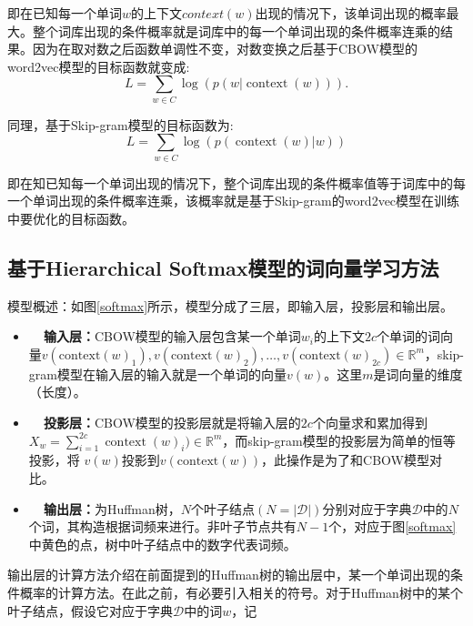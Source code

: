 即在已知每一个单词$w$的上下文$context(w)$出现的情况下，该单词出现的概率最大。整个词库出现的条件概率就是词库中的每一个单词出现的条件概率连乘的结果。因为在取对数之后函数单调性不变，对数变换之后基于CBOW模型的word2vec模型的目标函数就变成:
\begin{equation}
L = \sum _ { w \in C } \log \left( p \left( w | \operatorname { context } \left( w \right) \right) \right). 
\end{equation}

同理，基于Skip-gram模型的目标函数为:
\begin{equation}
L = \sum _ { w \in C } \log \left( p \left( \operatorname { context } \left( w \right) | w \right) \right)
\end{equation}

即在知已知每一个单词出现的情况下，整个词库出现的条件概率值等于词库中的每一个单词出现的条件概率连乘，该概率就是基于Skip-gram的word2vec模型在训练中要优化的目标函数。

\subsection{基于Hierarchical Softmax模型的词向量学习方法}

模型概述：如图\ref{softmax}所示，模型分成了三层，即输入层，投影层和输出层。
\begin{itemize}
    \item \textbf{~~输入层：}CBOW模型的输入层包含某一个单词$w_i$的上下文$2c$个单词的词向量$v \left( \text {context} ( w ) _ { 1 } \right) , v \left( \text {context} ( w ) _ { 2 } \right) , \ldots , v \left( \text {context} ( w ) _ { 2 c } \right) \in \mathbb { R } ^ { m }$，skip-gram模型在输入层的输入就是一个单词的向量$v(w)$。这里$m$是词向量的维度（长度）。
    \item \textbf{~~投影层：}CBOW模型的投影层就是将输入层的$2c$个向量求和累加得到$X _ { w } = \sum _ { i = 1 } ^ { 2 c } \operatorname { context } ( w ) _ { i } ) \in \mathbb { R } ^ { m }$，而skip-gram模型的投影层为简单的恒等投影，将 $v(w)$投影到$v(\text{context}(w))$，此操作是为了和CBOW模型对比。
    \item \textbf{~~输出层：}为Huffman树，$N$个叶子结点$(N=|\mathcal{D}|)$分别对应于字典$\mathcal{D}$中的$N$个词，其构造根据词频来进行。非叶子节点共有$N-1$个，对应于图\ref{softmax}中黄色的点，树中叶子结点中的数字代表词频。
\end{itemize}

输出层的计算方法介绍在前面提到的Huffman树的输出层中，某一个单词出现的条件概率的计算方法。在此之前，有必要引入相关的符号。对于Huffman树中的某个叶子结点，假设它对应于字典$\mathcal{D}$中的词$w$，记

